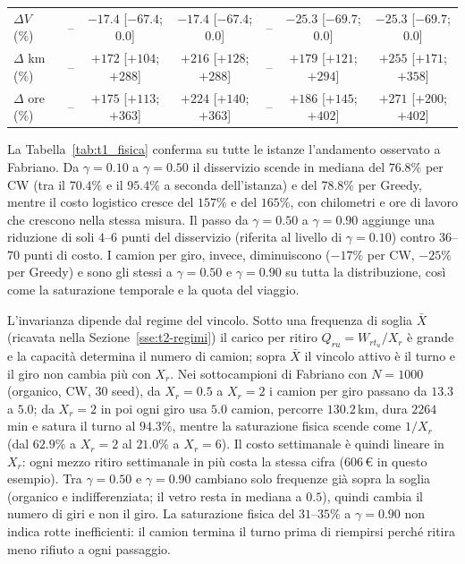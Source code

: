 \begin{table}[htbp]
{\begin{tabular}{lcccccc}
			$\Delta V$ (\%)                  & -- & $-17.4$ [$-67.4$; $0.0$] & $-17.4$ [$-67.4$; $0.0$] & -- & $-25.3$ [$-69.7$; $0.0$] & $-25.3$ [$-69.7$; $0.0$] \\
			$\Delta$ km (\%)                 & -- & $+172$ [$+104$; $+288$] & $+216$ [$+128$; $+288$] & -- & $+179$ [$+121$; $+294$] & $+255$ [$+171$; $+358$] \\
			$\Delta$ ore (\%)                & -- & $+175$ [$+113$; $+363$] & $+224$ [$+140$; $+363$] & -- & $+186$ [$+145$; $+402$] & $+271$ [$+200$; $+402$] \\
			\hline
	\end{tabular}}
\end{table}

La Tabella~\ref{tab:t1_fisica} conferma su tutte le istanze l'andamento osservato a Fabriano. Da $\gamma=0.10$ a $\gamma=0.50$ il disservizio scende in mediana del $76.8\%$ per CW (tra il $70.4\%$ e il $95.4\%$ a seconda dell'istanza) e del $78.8\%$ per Greedy, mentre il costo logistico cresce del $157\%$ e del $165\%$, con chilometri e ore di lavoro che crescono nella stessa misura. Il passo da $\gamma=0.50$ a $\gamma=0.90$ aggiunge una riduzione di soli $4$--$6$ punti del disservizio (riferita al livello di $\gamma=0.10$) contro $36$--$70$ punti di costo. I camion per giro, invece, diminuiscono ($-17\%$ per CW, $-25\%$ per Greedy) e sono gli stessi a $\gamma=0.50$ e $\gamma=0.90$ su tutta la distribuzione, così come la saturazione temporale e la quota del viaggio.

L'invarianza dipende dal regime del vincolo. Sotto una frequenza di soglia $\bar X$ (ricavata nella Sezione~\ref{sse:t2-regimi}) il carico per ritiro $Q_{ru}=W_{rt_u}/X_r$ è grande e la capacità determina il numero di camion; sopra $\bar X$ il vincolo attivo è il turno e il giro non cambia più con $X_r$. Nei sottocampioni di Fabriano con $N=1000$ (organico, CW, 30 seed), da $X_r=0.5$ a $X_r=2$ i camion per giro passano da $13.3$ a $5.0$; da $X_r=2$ in poi ogni giro usa $5.0$ camion, percorre $130.2$\,km, dura $2264$\,min e satura il turno al $94.3\%$, mentre la saturazione fisica scende come $1/X_r$ (dal $62.9\%$ a $X_r=2$ al $21.0\%$ a $X_r=6$). Il costo settimanale è quindi lineare in $X_r$: ogni mezzo ritiro settimanale in più costa la stessa cifra ($606$\,\euro{} in questo esempio). Tra $\gamma=0.50$ e $\gamma=0.90$ cambiano solo frequenze già sopra la soglia (organico e indifferenziata; il vetro resta in mediana a $0.5$), quindi cambia il numero di giri e non il giro. La saturazione fisica del $31$--$35\%$ a $\gamma=0.90$ non indica rotte inefficienti: il camion termina il turno prima di riempirsi perché ritira meno rifiuto a ogni passaggio.


